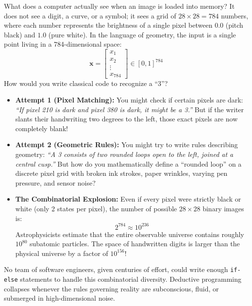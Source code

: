 What does a computer actually see when an image is loaded into memory? It does not see a digit, a curve, or a symbol; it sees a grid of $28 \times 28 = 784$ numbers, where each number represents the brightness of a single pixel between $0.0$ (pitch black) and $1.0$ (pure white). In the language of geometry, the input is a single point living in a 784-dimensional space:
\begin{equation}
\mathbf{x} = \begin{bmatrix} x_1 \\ x_2 \\ \vdots \\ x_{784} \end{bmatrix} \in [0, 1]^{784}
\end{equation}
How would you write classical code to recognize a ``3''?
\begin{itemize}
    \item \textbf{Attempt 1 (Pixel Matching):} You might check if certain pixels are dark: \emph{``If pixel 210 is dark and pixel 380 is dark, it might be a 3.''} But if the writer slants their handwriting two degrees to the left, those exact pixels are now completely blank!
    \item \textbf{Attempt 2 (Geometric Rules):} You might try to write rules describing geometry: \emph{``A 3 consists of two rounded loops open to the left, joined at a central cusp.''} But how do you mathematically define a ``rounded loop'' on a discrete pixel grid with broken ink strokes, paper wrinkles, varying pen pressure, and sensor noise?
    \item \textbf{The Combinatorial Explosion:} Even if every pixel were strictly black or white (only 2 states per pixel), the number of possible $28 \times 28$ binary images is:
    \begin{equation}
    2^{784} \approx 10^{236}
    \end{equation}
    Astrophysicists estimate that the entire observable universe contains roughly $10^{80}$ subatomic particles. The space of handwritten digits is larger than the physical universe by a factor of $10^{156}$!
\end{itemize}
No team of software engineers, given centuries of effort, could write enough \texttt{if-else} statements to handle this combinatorial diversity. Deductive programming collapses whenever the rules governing reality are subconscious, fluid, or submerged in high-dimensional noise.

